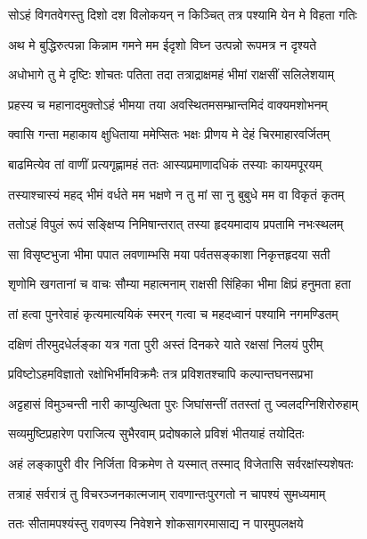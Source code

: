 \twolineshloka
{सोऽहं विगतवेगस्तु दिशो दश विलोकयन्}
{न किञ्चित् तत्र पश्यामि येन मे विहता गतिः} %

\twolineshloka
{अथ मे बुद्धिरुत्पन्ना किन्नाम गमने मम}
{ईदृशो विघ्न उत्पन्नो रूपमत्र न दृश्यते} %

\twolineshloka
{अधोभागे तु मे दृष्टिः शोचतः पतिता तदा}
{तत्राद्राक्षमहं भीमां राक्षसीं सलिलेशयाम्} %

\twolineshloka
{प्रहस्य च महानादमुक्तोऽहं भीमया तया}
{अवस्थितमसम्भ्रान्तमिदं वाक्यमशोभनम्} %

\twolineshloka
{क्वासि गन्ता महाकाय क्षुधिताया ममेप्सितः}
{भक्षः प्रीणय मे देहं चिरमाहारवर्जितम्} %

\twolineshloka
{बाढमित्येव तां वाणीं प्रत्यगृह्णामहं ततः}
{आस्यप्रमाणादधिकं तस्याः कायमपूरयम्} %

\twolineshloka
{तस्याश्चास्यं महद् भीमं वर्धते मम भक्षणे}
{न तु मां सा नु बुबुधे मम वा विकृतं कृतम्} %

\twolineshloka
{ततोऽहं विपुलं रूपं सङ्क्षिप्य निमिषान्तरात्}
{तस्या हृदयमादाय प्रपतामि नभःस्थलम्} %

\twolineshloka
{सा विसृष्टभुजा भीमा पपात लवणाम्भसि}
{मया पर्वतसङ्काशा निकृत्तहृदया सती} %

\twolineshloka
{शृणोमि खगतानां च वाचः सौम्या महात्मनाम्}
{राक्षसी सिंहिका भीमा क्षिप्रं हनुमता हता} %

\twolineshloka
{तां हत्वा पुनरेवाहं कृत्यमात्ययिकं स्मरन्}
{गत्वा च महदध्वानं पश्यामि नगमण्डितम्} %

\twolineshloka
{दक्षिणं तीरमुदधेर्लङ्का यत्र गता पुरी}
{अस्तं दिनकरे याते रक्षसां निलयं पुरीम्} %

\twolineshloka
{प्रविष्टोऽहमविज्ञातो रक्षोभिर्भीमविक्रमैः}
{तत्र प्रविशतश्चापि कल्पान्तघनसप्रभा} %

\twolineshloka
{अट्टहासं विमुञ्चन्ती नारी काप्युत्थिता पुरः}
{जिघांसन्तीं ततस्तां तु ज्वलदग्निशिरोरुहाम्} %

\twolineshloka
{सव्यमुष्टिप्रहारेण पराजित्य सुभैरवाम्}
{प्रदोषकाले प्रविशं भीतयाहं तयोदितः} %

\twolineshloka
{अहं लङ्कापुरी वीर निर्जिता विक्रमेण ते}
{यस्मात् तस्माद् विजेतासि सर्वरक्षांस्यशेषतः} %

\twolineshloka
{तत्राहं सर्वरात्रं तु विचरञ्जनकात्मजाम्}
{रावणान्तःपुरगतो न चापश्यं सुमध्यमाम्} %

\twolineshloka
{ततः सीतामपश्यंस्तु रावणस्य निवेशने}
{शोकसागरमासाद्य न पारमुपलक्षये} %


